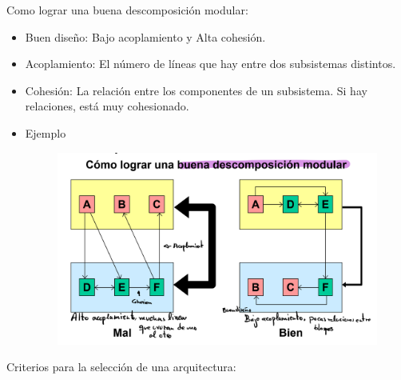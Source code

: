 \documentclass[12pt, twoside, openright]{report} %
\begin{document}
Como lograr una buena descomposición modular:

\begin{itemize}
	\item Buen diseño: Bajo acoplamiento y Alta cohesión.
	\item Acoplamiento: El número de líneas que hay entre dos subsistemas
		distintos.
	\item Cohesión: La relación entre los componentes de un subsistema. Si
		hay relaciones, está muy cohesionado.
	\pagebreak
	\item Ejemplo
	\begin{figure}[H]
		{\includegraphics[scale=.25]{Untitled 31.png}}
	\end{figure}

\end{itemize}

Criterios para la selección de una arquitectura:
\end{document}
